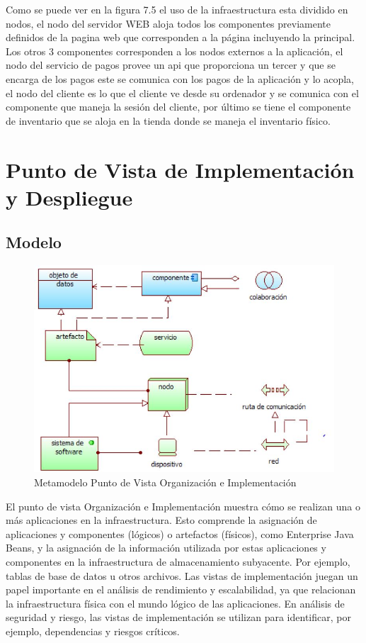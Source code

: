 Como se puede ver en la figura 7.5 el uso de la infraestructura esta dividido en nodos, el nodo del servidor WEB aloja todos los componentes previamente definidos de la pagina web que corresponden a la página incluyendo la principal.
\newline
Los otros 3 componentes corresponden a los nodos externos a la aplicación, el nodo del servicio de pagos provee un api que proporciona un tercer y que se encarga de los pagos este se comunica con los pagos de la aplicación y lo acopla, el nodo del cliente es lo que el cliente ve desde su ordenador y se comunica con el componente que maneja la sesión del cliente, por último se tiene el componente de inventario que se aloja en la tienda donde se maneja el inventario físico.

\newpage

\section{Punto de Vista de Implementación y Despliegue}

\subsection{Modelo}

\begin{figure}[th!]
	\centering
	\includegraphics[width=0.5\linewidth]{arquitectura/imagenes/modeloOrganizacionImplementacion}
	\caption{Metamodelo Punto de Vista Organización e Implementación}
	\label{metamodeloOrganizacionImplementacion}
\end{figure}
El punto de vista Organización e Implementación muestra cómo se realizan una o más aplicaciones en la infraestructura. Esto comprende la asignación de aplicaciones y componentes (lógicos) o artefactos (físicos), como Enterprise Java Beans, y la asignación de la información utilizada por estas aplicaciones y componentes en la infraestructura de almacenamiento subyacente. Por ejemplo, tablas de base de datos u otros archivos. Las vistas de implementación juegan un papel importante en el análisis de rendimiento y escalabilidad, ya que relacionan la infraestructura física con el mundo lógico de las aplicaciones. En análisis de seguridad y riesgo, las vistas de implementación se utilizan para identificar, por ejemplo, dependencias y riesgos críticos.

